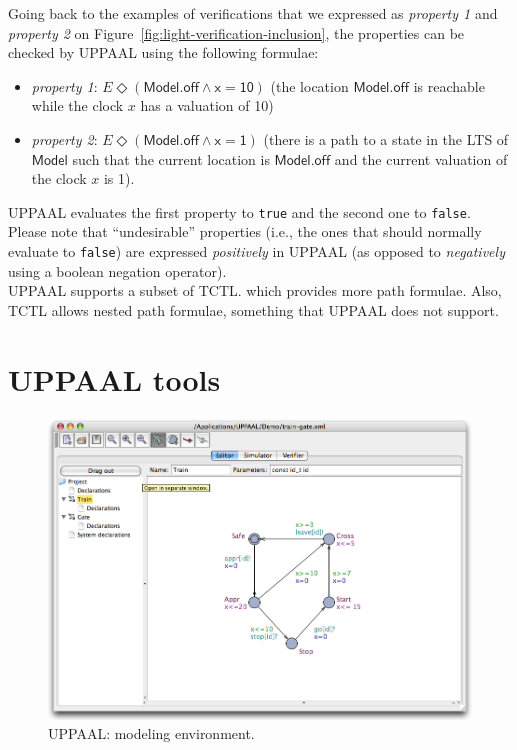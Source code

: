 Going back to the examples of verifications that we expressed as \emph{property 1} and \emph{property 2} on Figure~\ref{fig:light-verification-inclusion}, the properties can be checked by UPPAAL using the following formulae:
\begin{itemize}
  
  \item \emph{property 1}: $E\Diamond (\mathsf{Model.off \wedge x = 10})$ (the location $\mathsf{Model.off}$ is reachable while the clock $x$ has a valuation of 10)
  
  \item \emph{property 2}: $E\Diamond (\mathsf{Model.off \wedge x = 1})$ (there is a path to a state in the LTS of $\mathsf{Model}$ such that the current location is $\mathsf{Model.off}$ and the current valuation of the clock $x$ is 1).
  
\end{itemize}
UPPAAL evaluates the first property to \texttt{true} and the second one to \texttt{false}. Please note that ``undesirable'' properties (i.e., the ones that should normally evaluate to \texttt{false}) are expressed \emph{positively} in UPPAAL (as opposed to \emph{negatively} using a boolean negation operator).\\

UPPAAL supports a subset of TCTL. which provides more path formulae. Also, TCTL allows nested path formulae, something that UPPAAL does not support.


\section{UPPAAL tools}


\begin{figure}[htbp]
    \centering
    \includegraphics[width=\textwidth]{content/timed-automata/uppaal-1}
    \caption{UPPAAL: modeling environment.}
    \label{fig:uppaal-1}
\end{figure}

